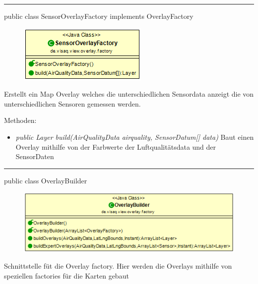 \rule{\textwidth}{0.4pt} 
public class SensorOverlayFactory implements OverlayFactory

\begin{minipage}{0.3\textwidth}
    \begin{figure}[H]
        \includegraphics[scale = 0.5]{media/frontend/view/de.view.overlay.factory/SensorOverlayFactory_Class.png}
    \end{figure}
    \end{minipage} \hfill
    \begin{minipage}{0.6\textwidth}
        Erstellt ein Map Overlay welches die unterschiedlichen Sensordata anzeigt die von unterschiedlichen Sensoren gemessen werden.
\end{minipage}

Methoden:
\begin{itemize} 
    \item \emph{public Layer build(AirQualityData airquality, SensorDatum[] data)}  Baut einen Overlay mithilfe von der Farbwerte der Luftqualitätsdata und der SensorDaten
\end{itemize}

\rule{\textwidth}{0.4pt} 
public class OverlayBuilder

\begin{minipage}{0.6\textwidth}
    \begin{figure}[H]
        \includegraphics[scale = 0.5]{media/frontend/view/de.view.overlay.factory/OverlayBuilder_Class.png}
    \end{figure}
    \end{minipage} \hfill
    \begin{minipage}{0.4\textwidth}
Schnittstelle füt die Overlay factory. Hier werden die Overlays mithilfe von speziellen factories für die Karten gebaut
\end{minipage}

